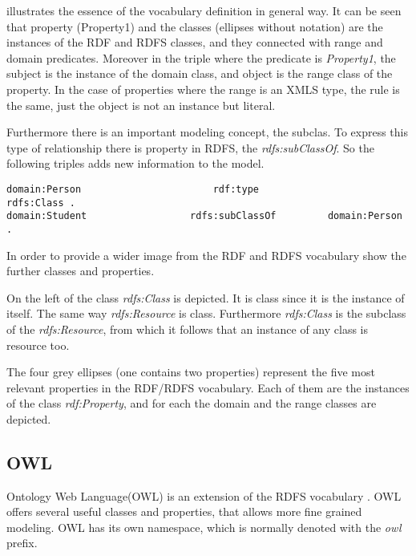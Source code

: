  illustrates the essence of the vocabulary definition in general way. It can be seen that property (Property1) and the classes (ellipses without notation) are the instances of the RDF and RDFS classes, and they connected with range and domain predicates. Moreover in the triple where the predicate is \textit{Property1}, the subject is the instance of the domain class, and object is the range class of the property. In the case of properties where the range is an XMLS type, the rule is the same, just the object is not an instance but literal.



Furthermore there is an important modeling concept, the subclas. To express this type of relationship there is property in RDFS, the \textit{rdfs:subClassOf}. So the following triples adds new information to the model.

\begin{lstlisting}[basicstyle=\footnotesize, captionpos=b, caption=Sub class definition, label=lst:sparql,
frame=single]
domain:Person						rdf:type						rdfs:Class .
domain:Student					rdfs:subClassOf			domain:Person .
\end{lstlisting}

In order to provide a wider image from the RDF and RDFS vocabulary  show the further classes and properties.




On the left of  the class \textit{rdfs:Class} is depicted. It is class since it is the instance of itself. The same way \textit{rdfs:Resource} is class. Furthermore \textit{rdfs:Class} is the subclass of the \textit{rdfs:Resource}, from which it follows that an instance of any class is resource too. 

The four grey ellipses (one contains two properties) represent the five most relevant properties in the RDF/RDFS vocabulary. Each of them are the instances of the class \textit{rdf:Property}, and for each the domain and the range classes are depicted.

\subsection{OWL}

Ontology Web Language(OWL) is an extension of the RDFS vocabulary \cite{Dean:04:OWO}. OWL offers several useful classes and properties, that allows more fine grained modeling. OWL has its own namespace, which is normally denoted with the \textit{owl} prefix.

